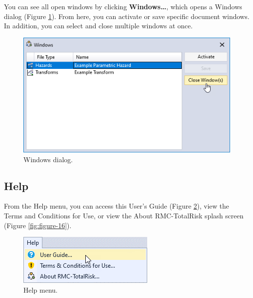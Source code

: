 \documentclass[
]{book}
\begin{document}
You can see all open windows by clicking \textbf{Windows\ldots{}}, which opens a Windows dialog (Figure \ref{fig:figure-14}). From here, you can activate or save specific document windows. In addition, you can select and close multiple windows at once.

\begin{figure}

{\centering \includegraphics{images/figure14} 

}

\caption{Windows dialog.}\label{fig:figure-14}
\end{figure}

\hypertarget{gui-menu-bar-help}{%
\subsection{Help}\label{gui-menu-bar-help}}

From the Help menu, you can access this User's Guide (Figure \ref{fig:figure-15}), view the Terms and Conditions for Use, or view the About RMC-TotalRisk splash screen (Figure \ref{fig:figure-16}).

\begin{figure}

{\centering \includegraphics{images/figure15} 

}

\caption{Help menu.}\label{fig:figure-15}
\end{figure}
\end{document}
